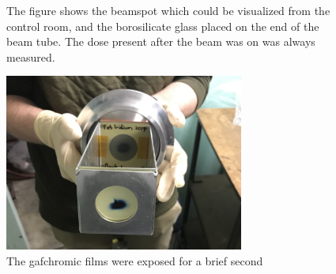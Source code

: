 \begin{figure}%
    \centering
    \caption{The figure shows the beamspot which could be visualized from the control room, and the borosilicate glass placed on the end of the beam tube. The dose present after the beam was on was always measured. }%
    \label{fig:tuning_phosphor+camera}%
\end{figure}

\begin{figure}
    \centering
    \includegraphics[width=0.7\textwidth]{Experiment/gafchromic_tune.jpg}
    \caption{The gafchromic films were exposed for a brief second }
    \label{fig:tuning_gafchromic}
\end{figure}

